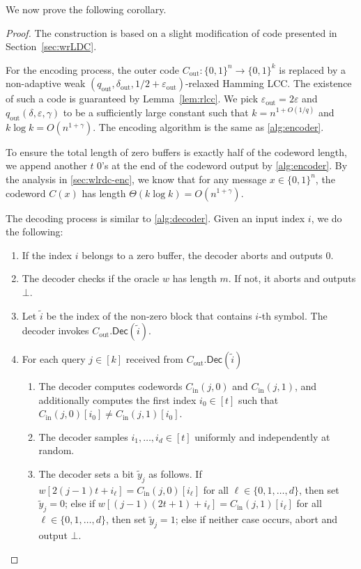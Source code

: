 \documentclass[10pt,a4paper]{article}
\theoremstyle{remark}
\newcommand{\zo}{\ensuremath{{\{0,1\}}}\xspace}
\newcommand{\eps}{\ensuremath{\varepsilon}}
\newcommand{\Dec}{\ensuremath{\mathsf{Dec}}\xspace}
\newcommand{\tildey}{\ensuremath{\widetilde{y}}\xspace}
\newcommand{\Cout}{C_{\text{out}}}
\newcommand{\dout}{\delta_{\text{out}}}
\newcommand{\qout}{q_{\text{out}}}
\newcommand{\epsout}{\eps_{\text{out}}}
\newcommand{\Cin}{C_{\text{in}}}
\begin{document}
We now prove the following corollary.

\strongirlcc*

\begin{proof}
The construction is based on a slight modification of code presented in Section~\ref{sec:wrLDC}.

For the encoding process, the outer code $\Cout \colon \zo^n \rightarrow \zo^{k}$ is replaced by a non-adaptive weak $(\qout,\dout,1/2+\epsout)$-relaxed Hamming LCC. 
The existence of such a code is guaranteed by Lemma~\ref{lem:rlcc}.
We pick $\epsout = 2\eps$ and $\qout(\delta, \eps, \gamma)$ to be a sufficiently large constant such that $k = {n^{1+O(1/q)}}$ and $k\log k = O(n^{1+\gamma}) $. 
The encoding algorithm is the same as \cref{alg:encoder}. 

To ensure the total length of zero buffers is exactly half of the codeword length, we append another $t$ 0's at the end of the codeword output by \cref{alg:encoder}. 
By the analysis in \cref{sec:wlrdc-enc}, we know that for any message $x\in\zo^n$, the codeword $C(x)$ has length $\Theta(k\log k) = O(n^{1+\gamma})$.



The decoding process is similar to \cref{alg:decoder}. Given an input index $i$, we do the following: 

\begin{enumerate}
    \item If the index $i$ belongs to a zero buffer, the decoder aborts and outputs $0$. 
    
	\item The decoder checks if the oracle $w$ has length $m$. If not, it aborts and outputs $\bot$.
	
	\item Let $\tilde{i}$ be the index of the non-zero block that contains $i$-th symbol. The decoder invokes $\Cout.\Dec(\tilde{i})$.
	
	\item For each query $j \in [k]$ received from $\Cout.\Dec(\tilde{i})$
	\begin{enumerate}
		\item The decoder computes codewords $\Cin(j, 0)$ and $\Cin(j,1)$, and additionally computes the first index $i_0 \in [t]$ such that $\Cin(j,0)[i_0] \neq \Cin(j,1)[i_0]$.
		
		\item The decoder samples $i_1,\dotsc, i_d \in [t]$ uniformly and independently at random.
		
		\item The decoder sets a bit $\tildey_j$ as follows. 
		If $w[ 2(j-1)t + i_\ell ] = \Cin(j,0)[i_\ell]$ for all $\ell \in \{0,1,\dotsc, d\}$, then set $\tildey_j = 0$; else if $w[ (j-1)(2t+1)+ i_\ell ] = \Cin(j,1)[i_\ell]$ for all $\ell \in \{0,1,\dotsc, d\}$, then set $\tildey_j = 1$; else if neither case occurs, abort and output $\bot$.
		

\end{enumerate}
\end{enumerate}
\end{proof}
\end{document}
